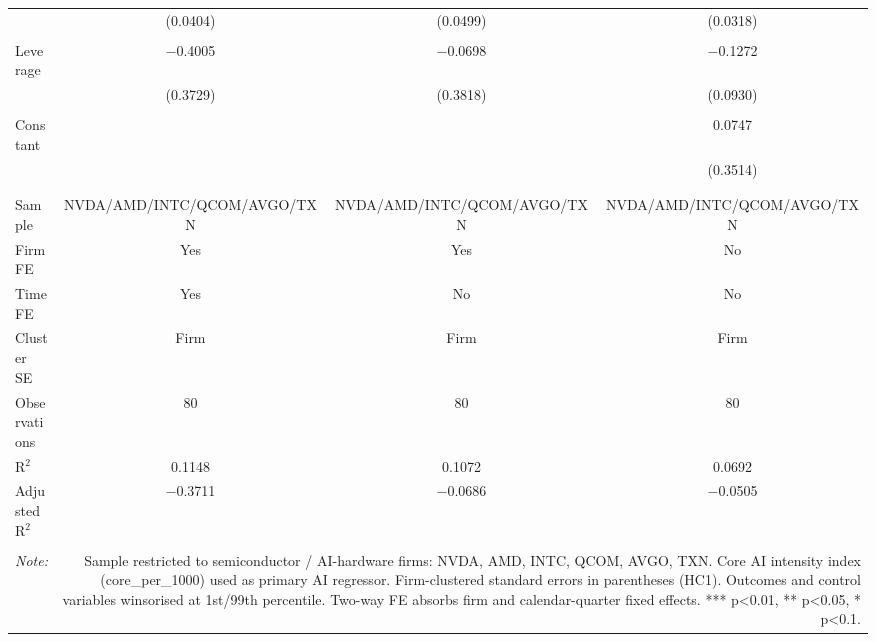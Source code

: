 \begin{table}[!htbp]
\begin{tabular}{@{\extracolsep{5pt}}lccc}
  & (0.0404) & (0.0499) & (0.0318) \\ 
  & & & \\ 
 Leverage & $-$0.4005 & $-$0.0698 & $-$0.1272 \\ 
  & (0.3729) & (0.3818) & (0.0930) \\ 
  & & & \\ 
 Constant &  &  & 0.0747 \\ 
  &  &  & (0.3514) \\ 
  & & & \\ 
\hline \\[-1.8ex] 
Sample & NVDA/AMD/INTC/QCOM/AVGO/TXN & NVDA/AMD/INTC/QCOM/AVGO/TXN & NVDA/AMD/INTC/QCOM/AVGO/TXN \\ 
Firm FE & Yes & Yes & No \\ 
Time FE & Yes & No & No \\ 
Cluster SE & Firm & Firm & Firm \\ 
Observations & 80 & 80 & 80 \\ 
R$^{2}$ & 0.1148 & 0.1072 & 0.0692 \\ 
Adjusted R$^{2}$ & $-$0.3711 & $-$0.0686 & $-$0.0505 \\ 
\hline 
\hline \\[-1.8ex] 
\textit{Note:}  & \multicolumn{3}{r}{Sample restricted to semiconductor / AI-hardware firms: NVDA, AMD, INTC, QCOM, AVGO, TXN. Core AI intensity index (core_per_1000) used as primary AI regressor. Firm-clustered standard errors in parentheses (HC1). Outcomes and control variables winsorised at 1st/99th percentile. Two-way FE absorbs firm and calendar-quarter fixed effects. *** p<0.01, ** p<0.05, * p<0.1.} \\ 
\end{tabular} 
\end{table} 
